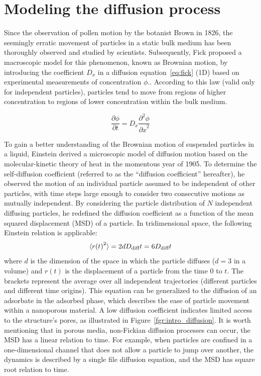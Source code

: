 \documentclass[main]{subfiles}
\begin{document}
\section{Modeling the diffusion process}

Since the observation of pollen motion by the botanist Brown in 1826, the seemingly erratic movement of particles in a static bulk medium has been thoroughly observed and studied by scientists. Subsequently, Fick proposed a macroscopic model for this phenomenon, known as Brownian motion, by introducing the coefficient $D_x$ in a diffusion equation~\ref{eq:fick} (1D) based on experimental measurements of concentration $\phi$.\autocite{Fick_1855}. According to this law (valid only for independent particles), particles tend to move from regions of higher concentration to regions of lower concentration within the bulk medium.

\begin{equation}\label{eq:fick}
  \frac{\partial \phi}{\partial t} = D_x \frac{\partial^2 \phi}{{\partial x}^2}
\end{equation}

To gain a better understanding of the Brownian motion of suspended particles in a liquid, Einstein derived a microscopic model of diffusion motion based on the molecular-kinetic theory of heat in the momentous year of 1905.\autocite{einstein1905motion} To determine the self-diffusion coefficient (referred to as the ``diffusion coefficient'' hereafter), he observed the motion of an individual particle assumed to be independent of other particles, with time steps large enough to consider two consecutive motions as mutually independent. By considering the particle distribution of $N$ independent diffusing particles, he redefined the diffusion coefficient as a function of the mean squared displacement (MSD) of a particle. In tridimensional space, the following Einstein relation is applicable:
\begin{equation}\label{eq:einstein}
  \langle {r(t)}^2 \rangle = 2dD_{\text{diff}}t = 6D_{\text{diff}}t
\end{equation}
where  $d$ is the dimension of the space in which the particle diffuses ($d=3$ in a volume) and $r(t)$ is the displacement of a particle from the time $0$ to $t$. The brackets represent the average over all independent trajectories (different particles and different time origins). This equation can be generalized to the diffusion of an adsorbate in the adsorbed phase, which describes the ease of particle movement within a nanoporous material. A low diffusion coefficient indicates limited access to the structure's pores, as illustrated in Figure~\ref{fgr:intro_diffusion}. It is worth mentioning that in porous media, non-Fickian diffusion processes can occur, the MSD has a linear relation to time. For example, when particles are confined in a one-dimensional channel that does not allow a particle to jump over another, the dynamics is described by a single file diffusion equation, and the MSD has square root relation to time.\autocite{Levitt_1973}
\end{document}
